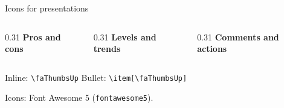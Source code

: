 \begin{frame}[t]{Icons for presentations}
    \begin{columns}[T,onlytextwidth]
        \begin{column}{0.31\textwidth}
            \textbf{Pros and cons}
            \par\medskip
        \end{column}
        \begin{column}{0.31\textwidth}
            \textbf{Levels and trends}
            \par\medskip
        \end{column}
        \begin{column}{0.31\textwidth}
            \textbf{Comments and actions}
            \par\medskip
        \end{column}
    \end{columns}
    \par\medskip
    {\scriptsize
        Inline: \texttt{\textbackslash faThumbsUp}\qquad
        Bullet: \texttt{\textbackslash item[\textbackslash faThumbsUp]}\par
    }
    \par\medskip
    {\scriptsize Icons: Font Awesome 5 (\texttt{fontawesome5}).\par}
\end{frame}

